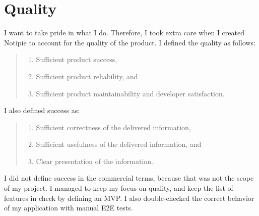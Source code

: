 \section{Quality}\label{sec:quality}

I want to take pride in what I do.
Therefore,
I took extra care when I created Notipie
to account for the quality of the product.
I defined the quality as follows:

\begin{quote}
  \begin{enumerate}
    \item Sufficient product success,
    \item Sufficient product reliability, and
    \item Sufficient product maintainability and developer satisfaction.
  \end{enumerate}
\end{quote}

I also defined success as:

\begin{quote}
  \begin{enumerate}
    \item Sufficient correctness of the delivered information,
    \item Sufficient usefulness of the delivered information, and
    \item Clear presentation of the information.
  \end{enumerate}
\end{quote}

I did not define success in the commercial terms,
because that was not the scope of my project.
I managed to keep my focus on quality,
and keep the list of features in check
by defining an MVP.
I also double-checked the correct behavior
of my application with manual E2E tests.




